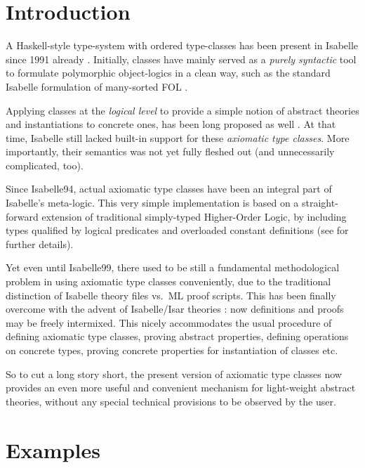 
\chapter{Introduction}

A Haskell-style type-system \cite{haskell-report} with ordered type-classes
has been present in Isabelle since 1991 already \cite{nipkow-sorts93}.
Initially, classes have mainly served as a \emph{purely syntactic} tool to
formulate polymorphic object-logics in a clean way, such as the standard
Isabelle formulation of many-sorted FOL \cite{paulson-isa-book}.

Applying classes at the \emph{logical level} to provide a simple notion of
abstract theories and instantiations to concrete ones, has been long proposed
as well \cite{nipkow-types93,nipkow-sorts93}.  At that time, Isabelle still
lacked built-in support for these \emph{axiomatic type classes}. More
importantly, their semantics was not yet fully fleshed out (and unnecessarily
complicated, too).

Since Isabelle94, actual axiomatic type classes have been an integral part of
Isabelle's meta-logic.  This very simple implementation is based on a
straight-forward extension of traditional simply-typed Higher-Order Logic, by
including types qualified by logical predicates and overloaded constant
definitions (see \cite{Wenzel:1997:TPHOL} for further details).

Yet even until Isabelle99, there used to be still a fundamental methodological
problem in using axiomatic type classes conveniently, due to the traditional
distinction of Isabelle theory files vs.\ ML proof scripts.  This has been
finally overcome with the advent of Isabelle/Isar theories
\cite{isabelle-isar-ref}: now definitions and proofs may be freely intermixed.
This nicely accommodates the usual procedure of defining axiomatic type
classes, proving abstract properties, defining operations on concrete types,
proving concrete properties for instantiation of classes etc.

\medskip

So to cut a long story short, the present version of axiomatic type classes
now provides an even more useful and convenient mechanism for light-weight
abstract theories, without any special technical provisions to be observed by
the user.


\chapter{Examples}\label{sec:ex}

